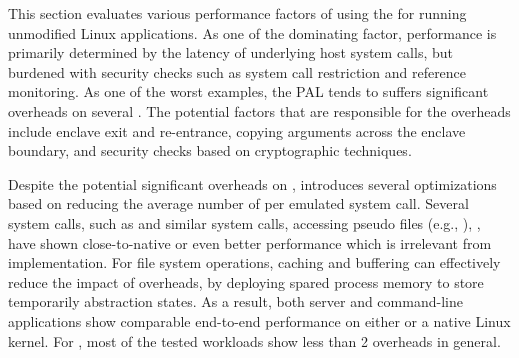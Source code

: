\label{sec:eval:summary}

This section evaluates
various performance factors of using the \graphene{} \libos{} for running unmodified Linux applications.
As one of the dominating factor,
\thehostabi{} performance is primarily determined by the latency of underlying host system calls,
but burdened with security checks such as system call restriction and reference monitoring.
As one of the worst examples,
the \sgx{} PAL tends to suffers significant overheads on several \hostapis{}.
The potential factors that are responsible for the overheads
include enclave exit and re-entrance,
copying \hostapi{} arguments across the enclave boundary,
and security checks based on cryptographic techniques.


Despite the potential significant overheads
on \thehostabi{},
\thelibos{} introduces several optimizations
based on reducing the average number of \hostapis{} per emulated system call.
Several system calls, such as  and similar system calls,
accessing pseudo files (e.g., ),
,
have shown close-to-native or even better performance
which is irrelevant from
\thehostabi{} implementation.
For file system operations,
caching and buffering can effectively reduce the impact of \hostapi{} overheads,
by deploying spared \picoproc{} process memory
to store temporarily abstraction states.
As a result, both server and command-line applications show comparable end-to-end performance
on either \graphene{} or a native Linux kernel.
For \graphenesgx{},
most of the tested workloads show less than 2\x{} overheads
in general.


